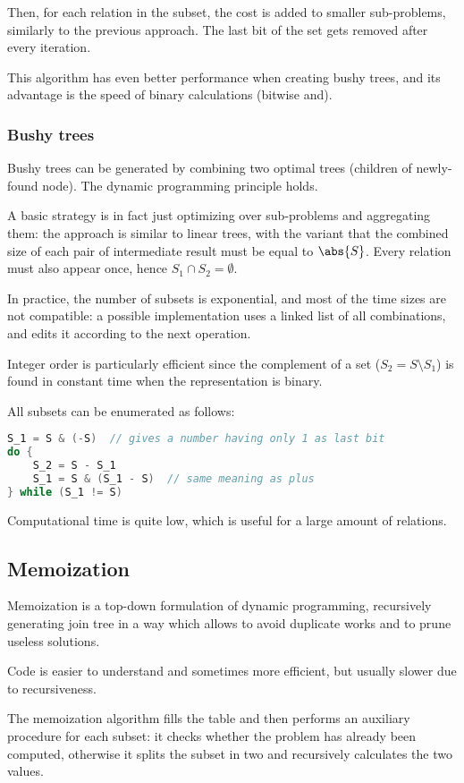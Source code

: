 Then, for each relation in the subset, the cost is added to smaller sub-problems, similarly to the previous approach. The last bit of the set gets removed after every iteration.

This algorithm has even better performance when creating bushy trees, and its advantage is the speed of binary calculations (bitwise and). 

\subsubsection{Bushy trees}
Bushy trees can be generated by combining two optimal trees (children of newly-found node). The dynamic programming principle holds.

A basic strategy is in fact just optimizing over sub-problems and aggregating them: the approach is similar to linear trees, with the variant that the combined size of each pair of intermediate result must be equal to $\abs{S}$. Every relation must also appear once, hence $S_1 \cap S_2 = \emptyset$.

In practice, the number of subsets is exponential, and most of the time sizes are not compatible: a possible implementation uses a linked list of all combinations, and edits it according to the next operation.

Integer order is particularly efficient since the complement of a set ($S_2 = S \setminus S_1$) is found in constant time when the representation is binary.

All subsets can be enumerated as follows:
\begin{lstlisting}[language=C++]
S_1 = S & (-S)  // gives a number having only 1 as last bit
do {
	S_2 = S - S_1
	S_1 = S & (S_1 - S)  // same meaning as plus
} while (S_1 != S)
\end{lstlisting}
Computational time is quite low, which is useful for a large amount of relations.

\subsection{Memoization}
Memoization is a top-down formulation of dynamic programming, recursively generating join tree in a way which allows to avoid duplicate works and to prune useless solutions.

Code is easier to understand and sometimes more efficient, but usually slower due to recursiveness.

The memoization algorithm fills the table and then performs an auxiliary procedure for each subset: it checks whether the problem has already been computed, otherwise it splits the subset in two and recursively calculates the two values.

